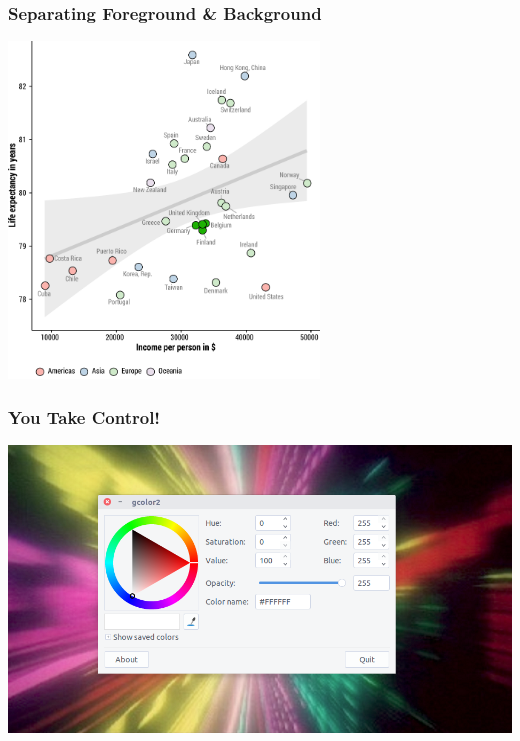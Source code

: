 \documentclass[hyperref={bookmarks=false}]{beamer}
\begin{document}

\begin{frame}
\frametitle{Separating Foreground \& Background}

\center\includegraphics[width = 0.62\textwidth]{./fig/fb3.pdf}


\end{frame}


\begin{frame}
\frametitle{You Take Control!}

\center\includegraphics[width = \textwidth]{./fig/color_picker.png}

\end{frame}

\end{document}
